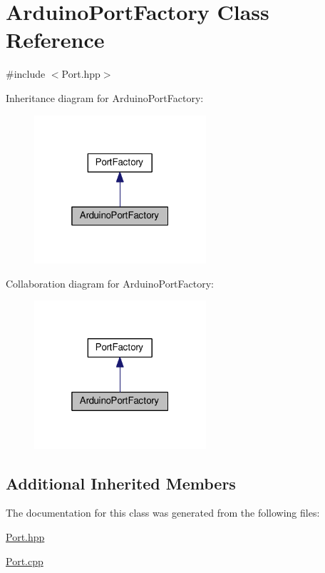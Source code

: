 \hypertarget{classArduinoPortFactory}{}\section{Arduino\+Port\+Factory Class Reference}
\label{classArduinoPortFactory}


{\ttfamily \#include $<$Port.\+hpp$>$}



Inheritance diagram for Arduino\+Port\+Factory\+:\nopagebreak
\begin{figure}[H]
\begin{center}
\leavevmode
\includegraphics[width=181pt]{classArduinoPortFactory__inherit__graph}
\end{center}
\end{figure}


Collaboration diagram for Arduino\+Port\+Factory\+:\nopagebreak
\begin{figure}[H]
\begin{center}
\leavevmode
\includegraphics[width=181pt]{classArduinoPortFactory__coll__graph}
\end{center}
\end{figure}
\subsection*{Additional Inherited Members}


The documentation for this class was generated from the following files\+:\begin{DoxyCompactItemize}
\item 
\hyperlink{Port_8hpp}{Port.\+hpp}\item 
\hyperlink{Port_8cpp}{Port.\+cpp}\end{DoxyCompactItemize}
